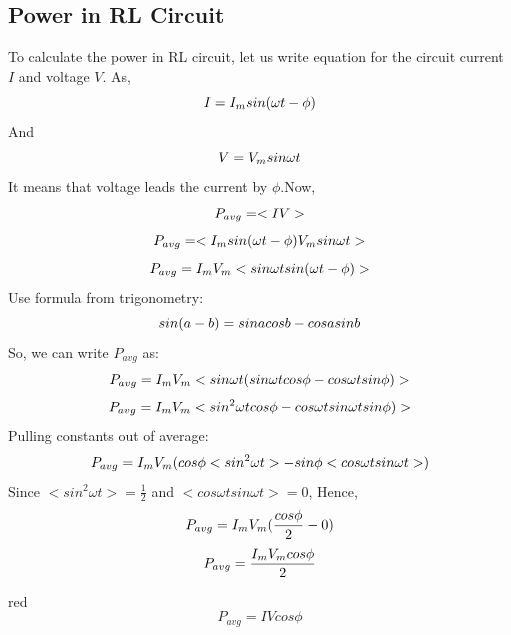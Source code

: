 \subsection*{Power in RL Circuit}
To calculate the power in RL circuit, let us write equation for the circuit
current $I$ and voltage $V$.
As,
\begin{equation}\notag
    I = I_{m} sin (\omega t - \phi)
\end{equation}
And
\begin{equation}\notag
    V = V_{m} sin \omega t
\end{equation}
It means that voltage leads the current by $\phi$.Now,
\begin{equation}\notag
   P_{avg}=<IV>
\end{equation}
\begin{equation}\notag
   P_{avg}=<I_{m} sin (\omega t - \phi)  V_{m} sin \omega t >
\end{equation}
\begin{equation}\notag
   P_{avg}=I_{m}  V_{m}<  sin \omega t sin (\omega t - \phi)  >
\end{equation}
Use formula from trigonometry:
\begin{equation}\notag
   sin(a-b)=sina cosb-cosa sinb
\end{equation}
So, we can write $P_{avg}$ as:
\begin{equation}\notag
   P_{avg}=I_{m}  V_{m}<  sin \omega t (sin \omega t cos \phi - cos \omega t sin \phi )  >
\end{equation}
\begin{equation}\notag
   P_{avg}=I_{m}  V_{m}<  sin^{2} \omega t cos \phi - cos \omega t sin\omega t sin \phi )  >
\end{equation}
Pulling constants out of average:
\begin{equation}\notag
   P_{avg}=I_{m}  V_{m}(  cos \phi <sin^{2} \omega t> -sin \phi< cos \omega t sin\omega t > )  
\end{equation}
Since $<sin^{2} \omega t> = \frac{1}{2}$ and $<cos \omega t sin\omega t>=0$,
Hence,
\begin{equation}\notag
   P_{avg} =I_{m}  V_{m}(\frac{cos \phi}{2}-0)
\end{equation}
\begin{equation}\notag
   P_{avg} = \frac{I_{m}  V_{m} cos \phi}{2}
\end{equation}
\begin{mybox}{red}{}
\begin{equation}
   P_{avg} = I V cos \phi
\end{equation}
\end{mybox}
